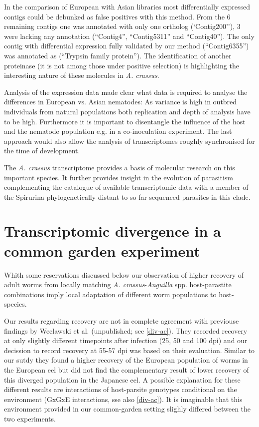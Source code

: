 In the comparison of European with Asian libraries most
differentially expressed contigs could be debunked as false positives
with this method. From the 6 remaining contigs one was annotated with
only one ortholog (`Contig200''), 3 were lacking any annotation
(``Contig4'', ``Contig5311'' and ``Contig40''). The only contig with
differential expression fully validated by our method (``Contig6355'')
was annotated as (``Trypsin family protein''). The identification of
another proteinase (it is not among those under positive selection) is
highlighting the interesting nature of these molecules in
\textit{A. crassus}.

Analysis of the expression data made clear what data is required to
analyse the differences in European vs. Asian nematodes: As variance
is high in outbred individuals from natural populations both
replication and depth of analysis have to be high. Furthermore it is
important to disentangle the influence of the host and the nematode
population e.g. in a co-inoculation experiment. The last approach
would also allow the analysis of transcriptomes roughly synchronised
for the time of development.

The \textit{A. crassus} transcriptome provides a basis of molecular
research on this important species. It further provides insight in
the evolution of parasitism complementing the catalogue of available
transcriptomic data with a member of the Spirurina phylogenetically
distant to so far sequenced parasites in this clade.

\section{Transcriptomic divergence in a common garden experiment}
\label{sec:exp-inf}

Whith some reservations discussed below our observation of higher
recovery of adult worms from locally matching
\textit{A. crassus}-\textit{Anguilla} spp. host-parastite combinations
imply local adaptation of different worm populations to host-species.

Our results regarding recovery are not in complete agreement with
previouse findings by Weclawski et al. (unpublished; see
\ref{div-ac}). They recorded recovery at only slightly different
timepoints after infection (25, 50 and 100 dpi) and our decission to
record recovery at 55-57 dpi was based on their evaluation.  Similar
to our sutdy they found a higher recovery of the European population
of worms in the European eel but did not find the complementary result
of lower recovery of this diverged population in the Japanese eel. A
possible explanation for these different results are interactions of
host-parsite genotypes conditional on the environment (GxGxE
interactions, sse also \ref{div-ac}). It is imaginable that this
environment provided in our common-garden setting slighly differed
between the two experiments.

